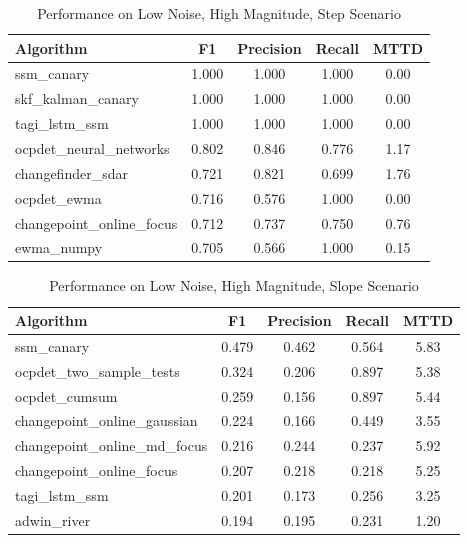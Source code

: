 \documentclass[journal,article,submit,pdftex,moreauthors]{Definitions/mdpi}
\begin{document}
\clearpage

\begin{table}[ht]
\centering
\caption{Performance on Low Noise, High Magnitude, Step Scenario}
\label{tab:scenario_bajo_alto_escalon}
\small
\begin{tabular}{lcccc}
\toprule
\textbf{Algorithm} & \textbf{F1} & \textbf{Precision} & \textbf{Recall} & \textbf{MTTD} \\
\midrule
ssm\_canary & 1.000 & 1.000 & 1.000 & 0.00 \\
skf\_kalman\_canary & 1.000 & 1.000 & 1.000 & 0.00 \\
tagi\_lstm\_ssm & 1.000 & 1.000 & 1.000 & 0.00 \\
ocpdet\_neural\_networks & 0.802 & 0.846 & 0.776 & 1.17 \\
changefinder\_sdar & 0.721 & 0.821 & 0.699 & 1.76 \\
ocpdet\_ewma & 0.716 & 0.576 & 1.000 & 0.00 \\
changepoint\_online\_focus & 0.712 & 0.737 & 0.750 & 0.76 \\
ewma\_numpy & 0.705 & 0.566 & 1.000 & 0.15 \\
\bottomrule
\end{tabular}
\end{table}

\clearpage

\begin{table}[ht]
\centering
\caption{Performance on Low Noise, High Magnitude, Slope Scenario}
\label{tab:scenario_bajo_alto_pendiente}
\small
\begin{tabular}{lcccc}
\toprule
\textbf{Algorithm} & \textbf{F1} & \textbf{Precision} & \textbf{Recall} & \textbf{MTTD} \\
\midrule
ssm\_canary & 0.479 & 0.462 & 0.564 & 5.83 \\
ocpdet\_two\_sample\_tests & 0.324 & 0.206 & 0.897 & 5.38 \\
ocpdet\_cumsum & 0.259 & 0.156 & 0.897 & 5.44 \\
changepoint\_online\_gaussian & 0.224 & 0.166 & 0.449 & 3.55 \\
changepoint\_online\_md\_focus & 0.216 & 0.244 & 0.237 & 5.92 \\
changepoint\_online\_focus & 0.207 & 0.218 & 0.218 & 5.25 \\
tagi\_lstm\_ssm & 0.201 & 0.173 & 0.256 & 3.25 \\
adwin\_river & 0.194 & 0.195 & 0.231 & 1.20 \\
\bottomrule
\end{tabular}
\end{table}
\end{document}
